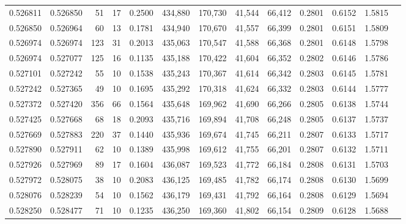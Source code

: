 \begin{tabular}{rrrrrrrrrrrrr}
0.526811 & 0.526850 &    51 &  17 &                                     0.2500 & 434,880 & 170,730 &  41,544 &  66,412 & 0.2801 & 0.6152 & 1.5815 \\
0.526850 & 0.526964 &    60 &  13 &                                     0.1781 & 434,940 & 170,670 &  41,557 &  66,399 & 0.2801 & 0.6151 & 1.5809 \\
0.526974 & 0.526974 &   123 &  31 &                                     0.2013 & 435,063 & 170,547 &  41,588 &  66,368 & 0.2801 & 0.6148 & 1.5798 \\
0.526974 & 0.527077 &   125 &  16 &                                     0.1135 & 435,188 & 170,422 &  41,604 &  66,352 & 0.2802 & 0.6146 & 1.5786 \\
0.527101 & 0.527242 &    55 &  10 &                                     0.1538 & 435,243 & 170,367 &  41,614 &  66,342 & 0.2803 & 0.6145 & 1.5781 \\
0.527242 & 0.527365 &    49 &  10 &                                     0.1695 & 435,292 & 170,318 &  41,624 &  66,332 & 0.2803 & 0.6144 & 1.5777 \\
0.527372 & 0.527420 &   356 &  66 &                                     0.1564 & 435,648 & 169,962 &  41,690 &  66,266 & 0.2805 & 0.6138 & 1.5744 \\
0.527425 & 0.527668 &    68 &  18 &                                     0.2093 & 435,716 & 169,894 &  41,708 &  66,248 & 0.2805 & 0.6137 & 1.5737 \\
0.527669 & 0.527883 &   220 &  37 &                                     0.1440 & 435,936 & 169,674 &  41,745 &  66,211 & 0.2807 & 0.6133 & 1.5717 \\
0.527890 & 0.527911 &    62 &  10 &                                     0.1389 & 435,998 & 169,612 &  41,755 &  66,201 & 0.2807 & 0.6132 & 1.5711 \\
0.527926 & 0.527969 &    89 &  17 &                                     0.1604 & 436,087 & 169,523 &  41,772 &  66,184 & 0.2808 & 0.6131 & 1.5703 \\
0.527972 & 0.528075 &    38 &  10 &                                     0.2083 & 436,125 & 169,485 &  41,782 &  66,174 & 0.2808 & 0.6130 & 1.5699 \\
0.528076 & 0.528239 &    54 &  10 &                                     0.1562 & 436,179 & 169,431 &  41,792 &  66,164 & 0.2808 & 0.6129 & 1.5694 \\
0.528250 & 0.528477 &    71 &  10 &                                     0.1235 & 436,250 & 169,360 &  41,802 &  66,154 & 0.2809 & 0.6128 & 1.5688 \\

\end{tabular}
